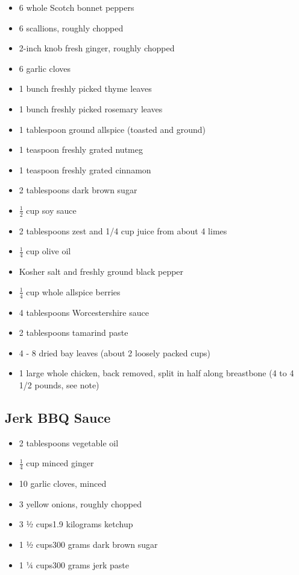 \documentclass[]{article}
\providecommand{\tightlist}{%
  \setlength{\itemsep}{0pt}\setlength{\parskip}{0pt}}
\begin{document}
\begin{itemize}
\tightlist
\item
  6 whole Scotch bonnet peppers
\item
  6 scallions, roughly chopped
\item
  2-inch knob fresh ginger, roughly chopped
\item
  6 garlic cloves
\item
  1 bunch freshly picked thyme leaves
\item
  1 bunch freshly picked rosemary leaves
\item
  1 tablespoon ground allspice (toasted and ground)
\item
  1 teaspoon freshly grated nutmeg
\item
  1 teaspoon freshly grated cinnamon
\item
  2 tablespoons dark brown sugar
\item
  \(\frac{1}{2}\) cup soy sauce
\item
  2 tablespoons zest and 1/4 cup juice from about 4 limes
\item
  \(\frac{1}{4}\) cup olive oil
\item
  Kosher salt and freshly ground black pepper
\item
  \(\frac{1}{4}\) cup whole allspice berries
\item
  4 tablespoons Worcestershire sauce
\item
  2 tablespoons tamarind paste
\item
  4 - 8 dried bay leaves (about 2 loosely packed cups)
\item
  1 large whole chicken, back removed, split in half along breastbone (4 to 4 1/2 pounds, see note)
\end{itemize}

\hypertarget{jerk-bbq-sauce}{%
\subsection{Jerk BBQ Sauce}\label{jerk-bbq-sauce}}

\begin{itemize}
\tightlist
\item
  2 tablespoons vegetable oil
\item
  \(\frac{1}{4}\) cup minced ginger
\item
  10 garlic cloves, minced
\item
  3 yellow onions, roughly chopped
\item
  3 ½ cups\textbar{}1.9 kilograms ketchup
\item
  1 ½ cups\textbar{}300 grams dark brown sugar
\item
  1 ¼ cups\textbar{}300 grams jerk paste
\end{itemize}
\end{document}

